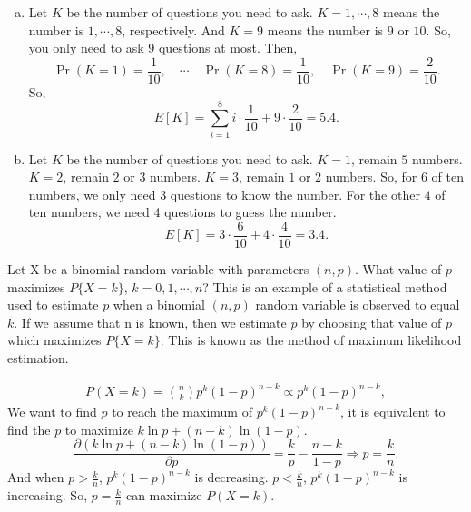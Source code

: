 \documentclass[14pt]{elegantbook}
\begin{document}
    \begin{solution}
        \begin{enumerate}[(a)]
            \item Let $K$ be the number of questions you need to ask. $K=1,\cdots,8$ means the number is $1, \cdots, 8$, respectively. And $K=9$ means the number is $9$ or $10$. So, you only need to ask $9$ questions at most.
            Then, \[
                \Pr(K=1)=\frac{1}{10}, \quad \cdots \quad \Pr(K=8)=\frac{1}{10}, \quad \Pr(K=9)=\frac{2}{10}. 
            \]
            So, 
            \[
                E[K]=\sum_{i=1}^8i\cdot\frac{1}{10}+9\cdot\frac{2}{10}=5.4. 
            \]
            \item Let $K$ be the number of questions you need to ask. $K=1$, remain $5$ numbers. $K=2$, remain $2$ or $3$ numbers. $K=3$, remain $1$ or $2$ numbers. So, for $6$ of ten numbers, we only need 3 questions to know the number. For the other $4$ of ten numbers, we need 4 questions to guess the number. 
            \[E[K]=3\cdot\frac{6}{10}+4\cdot\frac{4}{10}=3.4. \]
        \end{enumerate}
    \end{solution}

    \begin{exercise*}[3]
        Let X be a binomial random variable with parameters $(n, p)$. What value of $p$ maximizes $P\{X = k\}$, $k = 0, 1, \cdots, n$? This is an example of a statistical method used to estimate $p$ when a binomial $(n, p)$ random variable is observed to equal $k$. If we assume that n is known, then we estimate $p$ by choosing that value of $p$ which maximizes $P\{X = k\}$. This is known as the method of maximum likelihood estimation. 
    \end{exercise*}

    \begin{solution}
        \begin{align*}
            P(X=k)=\binom{n}{k}p^k(1-p)^{n-k}\propto p^k(1-p)^{n-k}, 
        \end{align*}
        We want to find $p$ to reach the maximum of $p^k(1-p)^{n-k}$, it is equivalent to find the $p$ to maximize $k\ln p+(n-k)\ln(1-p)$. 
        \[\frac{\partial (k\ln p+(n-k)\ln(1-p))}{\partial p}=\frac{k}{p}-\frac{n-k}{1-p}\Rightarrow p=\frac{k}{n}. \]
        And when $p>\frac{k}{n}$, $p^k(1-p)^{n-k}$ is decreasing. $p<\frac{k}{n}$, $p^k(1-p)^{n-k}$ is increasing. So, $p=\frac{k}{n}$ can maximize $P(X=k)$. 
    \end{solution}
\end{document}
